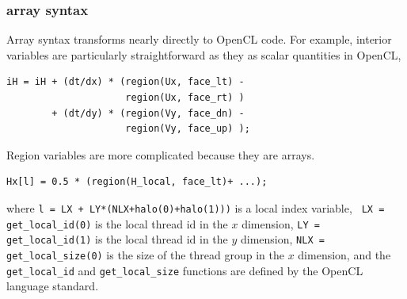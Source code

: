 \subsubsection{array syntax}

Array syntax transforms nearly directly to OpenCL code.  For example, interior
variables are particularly straightforward as they as scalar quantities in
OpenCL,

{\small
\begin{verbatim}
iH = iH + (dt/dx) * (region(Ux, face_lt) - 
                     region(Ux, face_rt) )
        + (dt/dy) * (region(Vy, face_dn) - 
                     region(Vy, face_up) );
\end{verbatim}
}

\noindent
Region variables are more complicated because they are arrays.

{\small
\begin{verbatim}
Hx[l] = 0.5 * (region(H_local, face_lt)+ ...);
\end{verbatim}
}

\noindent
where {\tt l = LX + LY*(NLX+halo(0)+halo(1)))} is a local index variable, {\tt
  LX = get\_local\_id(0)} is the local thread id in the $x$ dimension, {\tt LY =
  get\_local\_id(1)} is the local thread id in the $y$ dimension, {\tt NLX =
  get\_local\_size(0)} is the size of the thread group in the $x$ dimension, and
the {\tt get\_local\_id} and {\tt get\_local\_size} functions are defined by the
OpenCL language standard.
